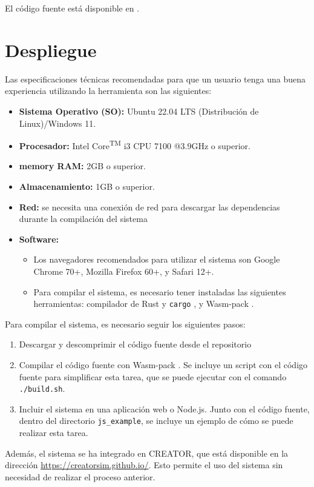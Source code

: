 \let\componentref\undefined

\noindent
El código fuente está disponible en \myrepo.

\FloatBarrier

\section{Despliegue}\label{sec:deployment}

\noindent
Las especificaciones técnicas recomendadas para que un usuario tenga una buena
experiencia utilizando la herramienta son las siguientes:

\begin{itemize}
    \item \textbf{Sistema Operativo (SO):} Ubuntu 22.04 LTS (Distribución de Linux)/Windows 11.
    \item \textbf{Procesador:} Intel\textsuperscript{\textregistered} Core\textsuperscript{TM} i3 CPU 7100 @3.9GHz o superior.
    \item \textbf{\Gls{memory} RAM:} 2GB o superior.
    \item \textbf{Almacenamiento:} 1GB o superior.
    \item \textbf{Red:} se necesita una conexión de red para descargar las
    dependencias durante la compilación del sistema
    \item \textbf{Software:}
    \begin{itemize}
        \item Los navegadores recomendados para utilizar el sistema son Google
        Chrome 70+, Mozilla Firefox 60+, y Safari 12+.
        \item Para compilar el sistema, es necesario tener instaladas las siguientes
        herramientas: compilador de Rust y \verb!cargo! \parencite{rust-toolchain},
        y Wasm-pack \parencite{Wasm-pack}.
    \end{itemize}
\end{itemize}

\noindent
Para compilar el sistema, es necesario seguir los siguientes pasos:

\begin{enumerate}
    \item Descargar y descomprimir el código fuente desde el repositorio
    \item Compilar el código fuente con Wasm-pack \parencite{Wasm-pack}. Se
    incluye un script con el código fuente para simplificar esta tarea,
    que se puede ejecutar con el comando \verb!./build.sh!.
    \item Incluir el sistema en una aplicación web o Node.js. Junto con el
    código fuente, dentro del directorio \verb!js_example!, se incluye un
    ejemplo de cómo se puede realizar esta tarea.
\end{enumerate}

Además, el sistema se ha integrado en CREATOR, que está disponible en la
dirección \url{https://creatorsim.github.io/}. Esto permite el uso del sistema
sin necesidad de realizar el proceso anterior.
